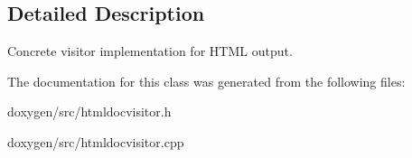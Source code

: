 \subsection{Detailed Description}
Concrete visitor implementation for H\+T\+ML output. 

The documentation for this class was generated from the following files\+:\begin{DoxyCompactItemize}
\item 
doxygen/src/htmldocvisitor.\+h\item 
doxygen/src/htmldocvisitor.\+cpp\end{DoxyCompactItemize}
